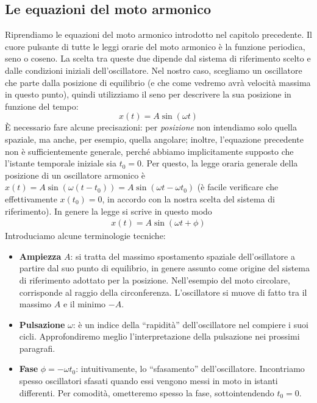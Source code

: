 \subsection{Le equazioni del moto armonico}
Riprendiamo le equazioni del moto armonico introdotto nel capitolo precedente.
Il cuore pulsante di tutte le leggi orarie del moto armonico è la funzione
periodica, seno o coseno. La scelta tra queste due dipende dal sistema di
riferimento scelto e dalle condizioni iniziali dell'oscillatore. Nel nostro
caso, scegliamo un oscillatore che parte dalla posizione di equilibrio
(e che come vedremo avrà velocità massima in questo punto), quindi utilizziamo
il seno per descrivere la sua posizione in funzione del tempo:
\[ x(t) = A\sin(\omega t) \]
È necessario fare alcune precisazioni: per \textit{posizione} non intendiamo
solo quella spaziale, ma anche, per esempio, quella angolare; inoltre,
l'equazione precedente non è sufficientemente generale, perché abbiamo
implicitamente supposto che l'istante temporale iniziale sia $t_0 = 0$. Per
questo, la legge oraria generale della posizione di un oscillatore armonico
è $x(t) = A\sin(\omega (t - t_0)) = A\sin(\omega t - \omega t_0)$ (è facile
verificare che effettivamente $x(t_0) = 0$, in accordo con la nostra scelta
del sistema di riferimento). In genere la legge si scrive in questo modo
\begin{align}
    x(t) = A\sin(\omega t + \phi)
\end{align}
Introduciamo alcune terminologie tecniche:
\begin{itemize}
    \item \textbf{Ampiezza} $A$: si tratta del massimo spostamento spaziale
    dell'osillatore a partire dal suo punto di equilibrio, in genere assunto
    come origine del sistema di riferimento adottato per la posizione. Nell'esempio del moto
    circolare, corrisponde al raggio della circonferenza. L'oscillatore si
    muove di fatto tra il massimo $A$ e il minimo $-A$.

    \item \textbf{Pulsazione} $\omega$: è un indice della ``rapidità''
    dell'oscillatore nel compiere i suoi cicli. Approfondiremo meglio
    l'interpretazione della pulsazione nei prossimi paragrafi.
    
    \item \textbf{Fase} $\phi = -\omega t_0$: intuitivamente, lo
    ``sfasamento'' dell'oscillatore. Incontriamo spesso oscillatori sfasati
    quando essi vengono messi in moto in istanti differenti. Per comodità,
    ometteremo spesso la fase, sottointendendo $t_0 = 0$.
\end{itemize}
